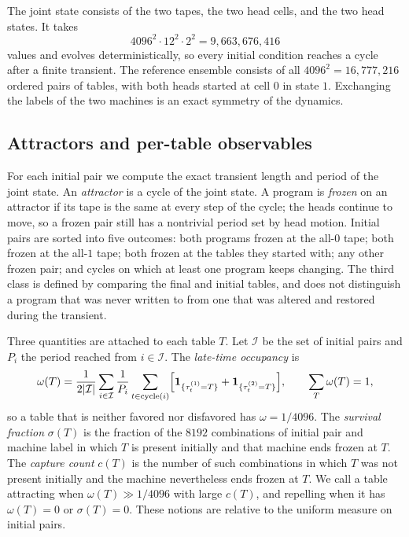 \documentclass{article}
\begin{document}
The joint state consists of the two tapes, the two head cells, and the
two head states.  It takes
\begin{equation}
4096^2\cdot12^2\cdot2^2=9{,}663{,}676{,}416
\end{equation}
values and evolves deterministically, so every initial condition reaches
a cycle after a finite transient.  The reference ensemble consists of all
$4096^2=16{,}777{,}216$ ordered pairs of tables, with both heads started at
cell $0$ in state $1$.  Exchanging the labels of the two machines is an
exact symmetry of the dynamics.

\subsection{Attractors and per-table observables}

For each initial pair we compute the exact transient length and period of
the joint state.  An \emph{attractor} is a cycle of the joint state.  A
program is \emph{frozen} on an attractor if its tape is the same at every
step of the cycle; the heads continue to move, so a frozen pair still has
a nontrivial period set by head motion.  Initial pairs are sorted into
five outcomes: both programs frozen at the all-$0$ tape; both frozen at
the all-$1$ tape; both frozen at the tables they started with; any other
frozen pair; and cycles on which at least one program keeps changing.  The
third class is defined by comparing the final and initial tables, and does
not distinguish a program that was never written to from one that was
altered and restored during the transient.

Three quantities are attached to each table $T$.  Let $\mathcal I$ be the
set of initial pairs and $P_i$ the period reached from $i\in\mathcal I$.
The \emph{late-time occupancy} is
\begin{equation}
\omega(T)=\frac{1}{2|\mathcal I|}\sum_{i\in\mathcal I}\frac{1}{P_i}
 \sum_{t\in{\rm cycle}(i)}
 \Bigl[\mathbf 1_{\{\tau^{(1)}_t=T\}}+\mathbf 1_{\{\tau^{(2)}_t=T\}}\Bigr],
\qquad \sum_T\omega(T)=1,
\end{equation}
so a table that is neither favored nor disfavored has
$\omega=1/4096$.  The \emph{survival fraction} $\sigma(T)$ is the fraction
of the $8192$ combinations of initial pair and machine label in which $T$
is present initially and that machine ends frozen at $T$.  The
\emph{capture count} $c(T)$ is the number of such combinations in which
$T$ was not present initially and the machine nevertheless ends frozen at
$T$.  We call a table attracting when $\omega(T)\gg1/4096$ with large
$c(T)$, and repelling when it has $\omega(T)=0$ or $\sigma(T)=0$.  These
notions are relative to the uniform measure on initial pairs.
\end{document}
